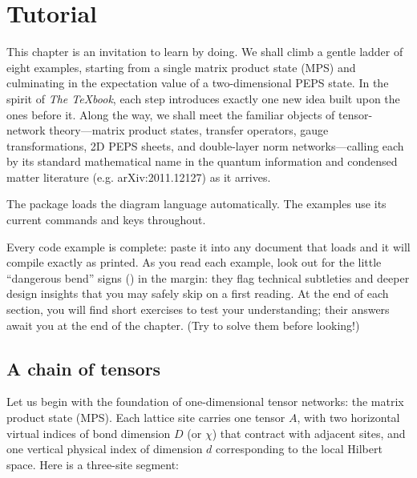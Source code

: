 \section{Tutorial}\label{ch:tutorial}

This chapter is an invitation to learn \pkg{} by doing.  We shall climb a
gentle ladder of eight examples, starting from a single matrix product state
(MPS) and culminating in the expectation value of a two-dimensional PEPS state.
In the spirit of \emph{The \TeX{}book}, each step introduces exactly one new idea
built upon the ones before it.  Along the way, we shall meet the familiar
objects of tensor-network theory---matrix product states, transfer operators,
gauge transformations, 2D PEPS sheets, and double-layer norm
networks---calling each by its standard mathematical name in the quantum
information and condensed matter literature (e.g. arXiv:2011.12127) as it
arrives.

The package loads the diagram language automatically.  The examples use its
current commands and keys throughout.

Every code example is complete: paste it into any document that loads \pkg{}
and it will compile exactly as printed.  As you read each example, look out
for the little ``dangerous bend'' signs (\textdbend) in the margin: they flag
technical subtleties and deeper design insights that you may safely skip on a
first reading.  At the end of each section, you will find short exercises to
test your understanding; their answers await you at the end of the chapter.
(Try to solve them before looking!)

\subsection{A chain of tensors}

Let us begin with the foundation of one-dimensional tensor networks: the
matrix product state (MPS).  Each lattice site carries one tensor $A$, with two
horizontal virtual indices of bond dimension $D$ (or $\chi$) that contract with
adjacent sites, and one vertical physical index of dimension $d$ corresponding
to the local Hilbert space.  Here is a three-site segment:

